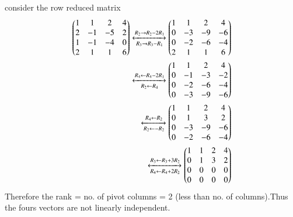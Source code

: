 consider the row reduced matrix
\begin{align}
    \begin{pmatrix}1&1&2&4\\2&-1&-5&2\\1&-1&-4&0\\2&1&1&6\end{pmatrix}
    \xleftrightarrow[R_3\rightarrow R_3-R_1]{R_2\rightarrow R_2-2R_1}\begin{pmatrix}1&1&2&4\\0&-3&-9&-6\\0&-2&-6&-4\\2&1&1&6\end{pmatrix}\\
     \xleftrightarrow[R_2\leftarrow R_4]{R_4\leftarrow R_4-2R_1}\begin{pmatrix}1&1&2&4\\0&-1&-3&-2\\0&-2&-6&-4\\0&-3&-9&-6\end{pmatrix}\\
     \xleftrightarrow[R_2\leftarrow -R_2]{R_4\leftarrow R_2}\begin{pmatrix}1&1&2&4\\0&1&3&2\\0&-3&-9&-6\\0&-2&-6&-4\end{pmatrix}\\
     \xleftrightarrow[R_4\leftarrow R_4+2R_2]{R_3\leftarrow R_3+3R_2}\begin{pmatrix}1&1&2&4\\0&1&3&2\\0&0&0&0\\0&0&0&0\end{pmatrix}
\end{align}
Therefore the rank = no. of pivot columns = 2 (less than no. of columns).Thus the fours vectors are not linearly independent.


